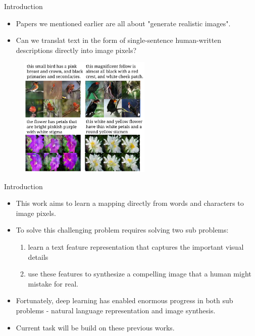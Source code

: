 \documentclass[10pt]{beamer}
\begin{document}
	\begin{frame}{Introduction}
		\begin{itemize}
			\item Papers we mentioned earlier are all about "generate realistic images".
			\item Can we translat text in the form of single-sentence human-written descriptions directly into image pixels?
		\end{itemize}
		\begin{figure}
			\includegraphics[width=17em]{figures/image-synthesis-prelude-demo.png}
		\end{figure}
	\end{frame}

	\begin{frame}{Introduction}
		\begin{itemize}
			\item This work aims to learn a mapping directly from words and characters to image pixels.
			\item To solve this challenging problem requires solving two sub problems:
			\begin{enumerate}
				\item learn a text feature representation that captures the important visual details
				\item use these features to synthesize a compelling image that a human might mistake for real.
			\end{enumerate}
			\item Fortunately, deep learning has enabled enormous progress in both sub problems - natural language representation and image synthesis.
			\item Current task will be build on these previous works.
		\end{itemize}
	\end{frame}
\end{document}
